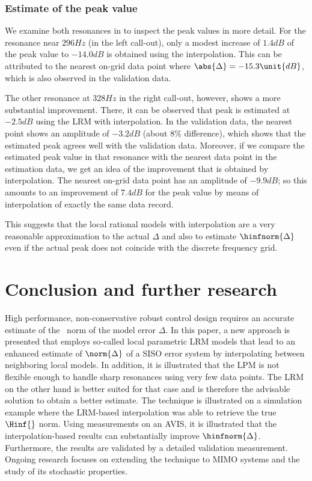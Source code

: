 \subsubsection{Estimate of the peak value}
We examine both resonances in  to inspect the peak values in more detail.
For the resonance near $296\unit{Hz}$ (in the left call-out), only a modest increase of $1.4\unit{dB}$ of the peak value to $-14.0 \unit{dB}$ is obtained using the interpolation.
This can be attributed to the nearest on-grid data point where $\abs{\Delta} = -15.3 \unit{dB}$, which is also observed in the validation data.

The other resonance at $328\unit{Hz}$ in the right call-out, however, shows a more substantial improvement.
There, it can be observed that peak is estimated at $-2.5\unit{dB}$ using the \gls{LRM} with interpolation.
In the validation data, the nearest point shows an amplitude of $-3.2\unit{dB}$ (about $8\%$ difference), which shows that the estimated peak agrees well with the validation data.
Moreover, if we compare the estimated peak value in that resonance with the nearest data point in the estimation data, we get an idea of the improvement that is obtained by interpolation.
The nearest on-grid data point has an amplitude of $-9.9 \unit{dB}$; so this amounts to an improvement of $7.4\unit{dB}$ for the peak value by means of interpolation of exactly the same data record.

This suggests that the local rational models with interpolation are a very reasonable approximation to the actual $\Delta$ and also to estimate $\hinfnorm{\Delta}$ even if the actual peak does not coincide with the discrete frequency grid.

\section{Conclusion and further research}
\label{sec:conclusion}
High performance, non-conservative robust control design requires an accurate estimate of the \Hinf\ norm of the model error $\Delta$.
In this paper, a new approach is presented that employs so-called local parametric \gls{LRM} models that lead to an enhanced estimate of $\norm{\Delta}$ of a \gls{SISO} error system by interpolating between neighboring local models. 
In addition, it is illustrated that the \gls{LPM} is not flexible enough to handle sharp resonances using very few data points.
The \gls{LRM} on the other hand is better suited for that case and is therefore the advisable solution to obtain a better estimate.
The technique is illustrated on a simulation example where the \gls{LRM}-based interpolation was able to retrieve the true $\Hinf{}$ norm.
Using measurements on an \gls{AVIS}, it is illustrated that the interpolation-based results can substantially improve $\hinfnorm{\Delta}$.
Furthermore, the results are validated by a detailed validation measurement. 
Ongoing research focuses on extending the technique to \gls{MIMO} systems and the study of its stochastic properties.



